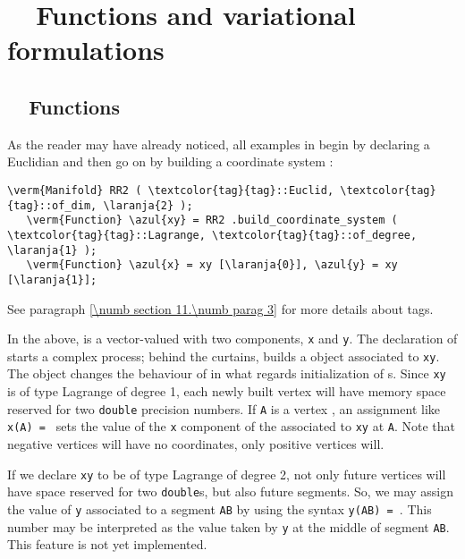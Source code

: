
\chapter{~~Functions and variational formulations}\label{\numb section 5}


\section{~~Functions}\label{\numb section 5.\numb parag 1}

As the reader may have already noticed, all examples in {\maniFEM} begin by declaring a
Euclidian {\small\tt{}} and then go on by building a coordinate system :

\begin{Verbatim}[commandchars=\\\{\},formatcom=\small\tt,
   baselinestretch=0.94,framesep=2mm                     ]
   \verm{Manifold} RR2 ( \textcolor{tag}{tag}::Euclid, \textcolor{tag}{tag}::of_dim, \laranja{2} );
   \verm{Function} \azul{xy} = RR2 .build_coordinate_system ( \textcolor{tag}{tag}::Lagrange, \textcolor{tag}{tag}::of_degree, \laranja{1} );
   \verm{Function} \azul{x} = xy [\laranja{0}], \azul{y} = xy [\laranja{1}];
\end{Verbatim}

See paragraph \ref{\numb section 11.\numb parag 3} for more details about tags.

In the above, {\small\tt{}} is a vector-valued {\small\tt{}}
with two components, {\small\tt x} and {\small\tt y}.
The declaration of {\small\tt{}} starts a complex process; behind the curtains,
{\maniFEM} builds a {\small\tt{}} object associated to {\small\tt xy}.
The {\small\tt{}} object changes the behaviour of {\maniFEM} in what regards
initialization of {\small\tt{}}s.
Since {\small\tt xy} is of type Lagrange of degree 1, each newly built vertex
{\small\tt{}} will have memory space reserved for two {\small\tt double}
precision numbers.
If {\small\tt A} is a vertex {\small\tt{}}, an assignment like
{\small\tt x(A) = } sets the value of the {\small\tt x} component of the
{\small\tt{}} associated to {\small\tt xy} at {\small\tt A}.
Note that negative vertices will have no coordinates, only positive vertices will.

If we declare {\small\tt xy} to be of type Lagrange of degree 2, not only future vertices will
have space reserved for two {\small\tt double}s, but also future segments.
So, we may assign the value of {\small\tt y} associated to a segment {\small\tt AB} by using
the syntax {\small\tt y(AB) = }.
This number may be interpreted as the value taken by {\small\tt y} at the middle of
segment {\small\tt AB}.
This feature is not yet implemented.

